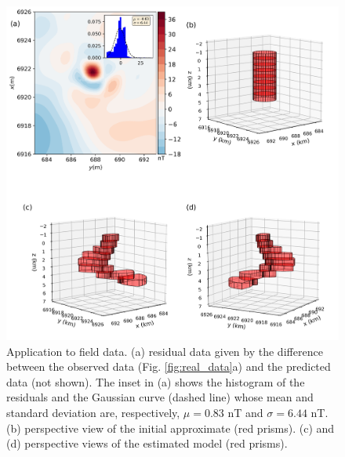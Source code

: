\begin{figure}
    \centering
    \includegraphics[scale=.5]{figures/real_results.png}
    \caption{Application to field data. (a) residual data given by the difference between the observed data (Fig. \ref{fig:real_data}a) and the predicted data (not shown). The inset in (a) shows the histogram of the residuals and the Gaussian curve (dashed line) whose mean and standard deviation are, respectively, $\mu = 0.83$ nT and $\sigma=6.44$ nT. (b) perspective view of the initial approximate (red prisms). (c) and (d) perspective views of the estimated model (red prisms). 
}
    \label{fig:real_result}
\end{figure}